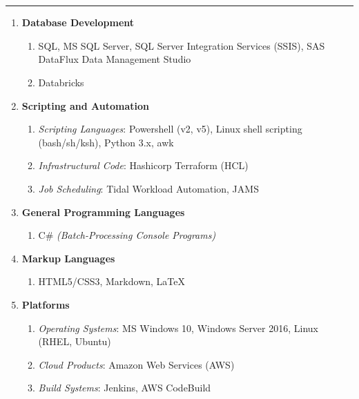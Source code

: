 \documentclass[11pt]{article}
\newcommand{\uppr}[3]{ \noindent\MakeUppercase{{\fontsize{#2}{#3} \selectfont {#1}}} }
\begin{document}
\section*{\uppr{Technical Skills}{14}{16}} \noindent\rule{1.0\textwidth}{0.4pt}
\setlength{\leftmargini}{0pt}
\begin{enumerate}[topsep=0pt, partopsep=0pt, label=\null]

\item \textbf{Database Development}
  \begin{enumerate}[topsep=0pt, partopsep=0pt, label=\null]
  \item SQL, MS SQL Server, SQL Server Integration Services (SSIS), SAS DataFlux Data Management Studio
  \item Databricks
  \end{enumerate}
\item \textbf{Scripting and Automation}
  \begin{enumerate}[topsep=0pt, partopsep=0pt, label=\null]
  \item \textit{Scripting Languages}: Powershell (v2, v5), Linux shell scripting (bash/sh/ksh), Python 3.x, awk
  \item \textit{Infrastructural Code}: Hashicorp Terraform (HCL)
  \item \textit{Job Scheduling}: Tidal Workload Automation, JAMS
  \end{enumerate}
\item \textbf{General Programming Languages}
  \begin{enumerate}[topsep=0pt, partopsep=0pt, label=\null]
  \item C\# \textit{(Batch-Processing Console Programs)}
  \end{enumerate}
\item \textbf{Markup Languages}
  \begin{enumerate}[topsep=0pt, partopsep=0pt, label=\null]
  \item HTML5/CSS3, Markdown, {\LaTeX}
  \end{enumerate}
\item \textbf{Platforms}
  \begin{enumerate}[topsep=0pt, partopsep=0pt, label=\null]
  \item \textit{Operating Systems}: MS Windows 10, Windows Server 2016, Linux (RHEL, Ubuntu)
  \item \textit{Cloud Products}: Amazon Web Services (AWS)
  \item \textit{Build Systems}: Jenkins, AWS CodeBuild

\end{enumerate}
\end{enumerate}
\end{document}
